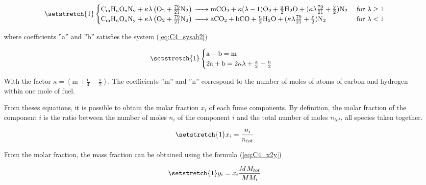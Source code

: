 \begin{equation}
    \setstretch{1}
    \begin{cases}
        \ce{C_{\text{m}}H_{\text{n}}O_{\text{x}}N_{\text{y}} +}\kappa\lambda \left(\ce{O2}+\frac{79}{21}\ce{N2}\right) \ce{-> mCO2 +} \kappa(\lambda-1)\ce{O2 + \frac{n}{2}H2O +} (\kappa\lambda\frac{79}{21} + \frac{\text{y}}{2})\ce{N2} & \text{ for \(\lambda\geq 1\)} \\
        \ce{C_{\text{m}}H_{\text{n}}O_{\text{x}}N_{\text{y}} +}\kappa\lambda \left(\ce{O2}+\frac{79}{21}\ce{N2}\right) \ce{-> aCO2 + bCO + \frac{n}{2}H2O} + (\kappa\lambda\frac{79}{21} + \frac{\text{y}}{2})\ce{N2}                      & \text{ for \(\lambda< 1\)}
    \end{cases}\label{eq:C4_chemgeng01}
\end{equation}

where coefficients ''a'' and ''b'' satisfies the system (\ref{eq:C4_sysab2})

\begin{equation}
    \setstretch{1}
    \begin{cases}
        \text{a} + \text{b} = \text{m} \\
        2\text{a} + \text{b} = 2\kappa\lambda + \frac{\text{x}}{2} - \frac{\text{n}}{2}
    \end{cases}\label{eq:C4_sysab2}
\end{equation}

With the factor \(\kappa = (\text{m}+\frac{\text{n}}{4}-\frac{\text{x}}{2})\). The coefficients ''m'' and ''n'' correspond to the number of moles of atoms of carbon and hydrogen within one mole of fuel.

From theses equations, it is possible to obtain the molar fraction \(x_i\) of each fume components. By definition, the molar fraction of the component \(i\) is the ratio between the number of moles \(n_i\) of the component \(i\) and the total number of moles \(n_{tot}\), all species taken together.

\begin{equation*}
    \setstretch{1}
    x_i = \frac{n_i}{n_{tot}}
\end{equation*}

From the molar fraction, the mass fraction can be obtained using the formula (\ref{eq:C4_x2y})

\begin{equation}
    \setstretch{1}
    y_i = x_i\frac{MM_{tot}}{MM_i} \label{eq:C4_x2y}
\end{equation}

